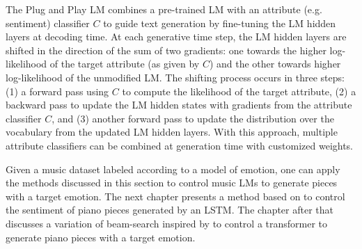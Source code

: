 The Plug and Play LM \cite{dathathri2019plug} combines a pre-trained LM with an attribute (e.g. sentiment) classifier $C$ to guide text generation by fine-tuning the LM hidden layers at decoding time. At each generative time step, the LM hidden layers are shifted in the direction of the sum of two gradients: one towards the higher log-likelihood of the target attribute (as given by $C$) and the other towards higher log-likelihood of the unmodified LM. The shifting process occurs in three steps: (1) a forward pass using $C$ to compute the likelihood of the target attribute, (2) a backward pass to update the LM hidden states with gradients from the attribute classifier $C$, and (3) another forward pass to update the distribution over the vocabulary from the updated LM hidden layers. With this approach, multiple attribute classifiers can be combined at generation time with customized weights.


Given a music dataset labeled according to a model of emotion, one can apply the methods discussed in this section to control music LMs to generate pieces with a target emotion. The next chapter presents a method based on \citet{radford_2017} to control the sentiment of piano pieces generated by an LSTM. The chapter after that discusses a variation of beam-search inspired by \citet{holtzman2018learning} to control a transformer to generate piano pieces with a target emotion.
